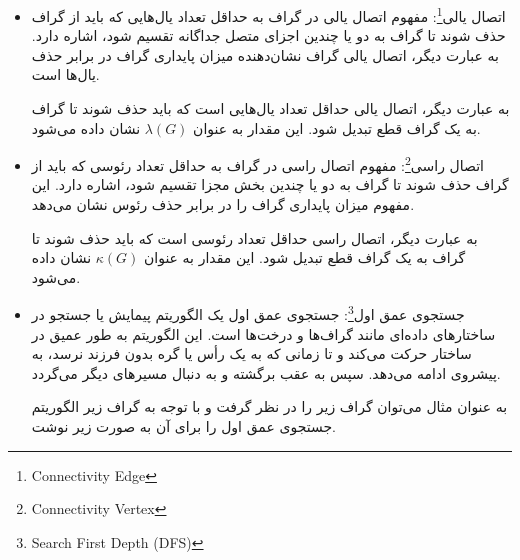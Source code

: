 \documentclass[a4paper,10pt]{article}
\begin{document}
\begin{itemize}
\begin{center}

        \end{center}

        \item اتصال یالی\footnote{\hspace{2pt}Connectivity Edge}: مفهوم اتصال یالی در گراف به حداقل تعداد یال‌هایی که باید از گراف حذف شوند تا گراف به دو یا چندین اجزای متصل جداگانه تقسیم شود، اشاره دارد. به عبارت دیگر، اتصال یالی گراف نشان‌دهنده‌ میزان پایداری گراف در برابر حذف یال‌ها است.

        به عبارت دیگر، اتصال یالی حداقل تعداد یال‌هایی است که باید حذف شوند تا گراف به یک گراف قطع تبدیل شود. این مقدار به عنوان $\lambda (G)$ نشان داده می‌شود.

        \item اتصال راسی\footnote{\hspace{2pt}Connectivity Vertex}: مفهوم اتصال راسی در گراف به حداقل تعداد رئوسی که باید از گراف حذف شوند تا گراف به دو یا چندین بخش مجزا تقسیم شود، اشاره دارد. این مفهوم میزان پایداری گراف را در برابر حذف رئوس نشان می‌دهد.
        
        به عبارت دیگر، اتصال راسی حداقل تعداد رئوسی است که باید حذف شوند تا گراف به یک گراف قطع تبدیل شود. این مقدار به عنوان $\kappa (G)$ نشان داده می‌شود.

        \item جستجوی عمق اول\footnote{\hspace{2pt}Search First Depth (DFS)}: جستجوی عمق‌ اول یک الگوریتم پیمایش یا جستجو در ساختارهای داده‌ای مانند گراف‌ها و درخت‌ها است. این الگوریتم به طور عمیق در ساختار حرکت می‌کند و تا زمانی که به یک رأس یا گره بدون فرزند نرسد، به پیشروی ادامه می‌دهد. سپس به عقب برگشته و به دنبال مسیرهای دیگر می‌گردد.
        
        به عنوان مثال می‌توان گراف زیر را در نظر گرفت و با توجه به گراف زیر الگوریتم جستجوی عمق اول را برای آن به صورت زیر نوشت.

        \begin{table}
            

\end{table}
\end{itemize}
\end{document}
